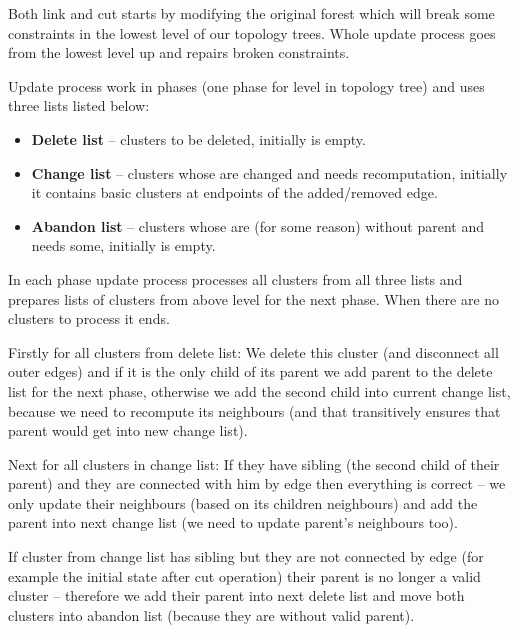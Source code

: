 Both link and cut starts by modifying the original forest which will break some
constraints in the lowest level of our topology trees. Whole update process
goes from the lowest level up and repairs broken constraints.

Update process work in phases (one phase for level in topology tree) and uses
three lists listed below:
\begin{itemize}
\item {\bf Delete list} -- clusters to be deleted, initially is empty.
\item {\bf Change list} -- clusters whose are changed and needs recomputation, initially
it contains basic clusters at endpoints of the added/removed edge.
\item {\bf Abandon list} -- clusters whose are (for some reason) without parent and
needs some, initially is empty.
\end{itemize}

In each phase update process processes all clusters from all three lists and
prepares lists of clusters from above level for the next phase. When there are
no clusters to process it ends.

Firstly for all clusters from delete list: We delete this cluster (and
disconnect all outer edges) and if it is the only child of its parent we add
parent to the delete list for the next phase, otherwise we add the second child
into current change list, because we need to recompute its neighbours (and
that transitively ensures that parent would get into new change list).

Next for all clusters in change list: If they have sibling (the second child of
their parent) and they are connected with him by edge then everything is correct
-- we only update their neighbours (based on its children neighbours) and add
the parent into next change list (we need to update parent's neighbours too).

If cluster from change list has sibling but they are not connected by edge (for
example the initial state after cut operation) their parent is no longer a
valid cluster -- therefore we add their parent into next delete list and move
both clusters into abandon list (because they are without valid parent).

